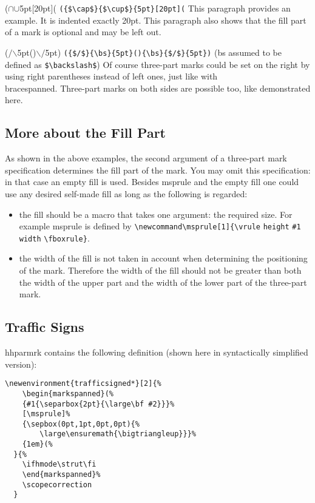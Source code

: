 \documentclass[11pt]{article}
\makeatletter
\def\packagename#1{{\sffamily #1}}     %
\def\macroname#1{{\ttfamily\@ttbs#1}}  %
\def\envirname#1{{\ttfamily #1}}       %
\def\hhparmrk{\packagename{hhparmrk}\xspace}
\def\={\verb=}
\def\<#1>{\macroname{#1}}
\def\:{\linebreak[1]}
\def\fverb{\sbox\@tempboxa\bgroup\verb}
\def\brevf{%
  \egroup\leavevmode{\setlength\fboxsep{2pt}\fbox{\box\@tempboxa}} }
\makeatother
\begin{document}
\begin{bracespanned}
\begin{markspanned}
\begin{markspanned}({$\cap$}{$\cup$}{5pt}[20pt](
\fverb=({$\cap$}{$\cup$}{5pt}[20pt](=\brevf
This paragraph provides an example.
It is indented exactly 20pt. This paragraph also shows that the
fill part of a mark is optional and may be left out.
\end{markspanned}

\begin{markspanned}({$/$}{$\backslash$}{5pt}(){$\backslash$}{$/$}{5pt})
\fverb=({$/$}{\bs}{5pt}(){\bs}{$/$}{5pt})=\brevf
(\<bs> assumed to be defined as \=$\backslash$=)
Of course three-part marks could be set on the right by using right
parentheses instead of left ones, just like with\\\envirname{bracespanned}.
Three-part marks on both sides are possible too, like demonstrated here.
\end{markspanned}

\subsection{More about the Fill Part}
As shown in the above examples, the second argument of a three-part mark
specification determines the fill part of the mark. You may omit this
specification: in that case an empty fill is used. Besides \<msprule> and
the empty fill one could use any desired self-made fill as long as the
following is regarded:\begin{itemize}
\item the fill should be a macro that takes one argument: the required
      size. For example \<msprule> is defined by \=\newcommand=\:%
      \=\msprule=\:\=[1]{\vrule= \=height= \=#1= \=width=
      \=\fboxrule=\:\=}=.
\item the width of the fill is not taken in account when determining the
      positioning of the mark. Therefore the width of the fill should not
      be greater than both the width of the upper part and the width
      of the lower part of the three-part mark.
\end{itemize}

\subsection{Traffic Signs}

\hhparmrk contains the following definition (shown here in syntactically
simplified version):

\begin{verbatim}
\newenvironment{trafficsigned*}[2]{%
    \begin{markspanned}(%
    {#1{\separbox{2pt}{\large\bf #2}}}%
    [\msprule]%
    {\sepbox(0pt,1pt,0pt,0pt){%
        \large\ensuremath{\bigtriangleup}}}%
    {1em}(%
  }{%
    \ifhmode\strut\fi
    \end{markspanned}%
    \scopecorrection
  }
\end{verbatim}


\end{markspanned}
\end{bracespanned}
\end{document}

